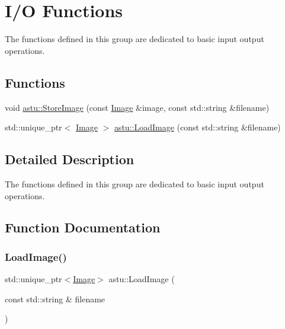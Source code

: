 \hypertarget{group__io__group}{}\section{I/O Functions}
\label{group__io__group}


The functions defined in this group are dedicated to basic input output operations.  


\subsection*{Functions}
\begin{DoxyCompactItemize}
\item 
void \hyperlink{group__io__group_gaca5f9cb8047c60049300242c20d30cd6}{astu\+::\+Store\+Image} (const \hyperlink{classastu_1_1Image}{Image} \&image, const std\+::string \&filename)
\item 
std\+::unique\+\_\+ptr$<$ \hyperlink{classastu_1_1Image}{Image} $>$ \hyperlink{group__io__group_ga46ac561eac42d4ace785797db8bc89a0}{astu\+::\+Load\+Image} (const std\+::string \&filename)
\end{DoxyCompactItemize}


\subsection{Detailed Description}
The functions defined in this group are dedicated to basic input output operations. 



\subsection{Function Documentation}
\mbox{\label{group__io__group_ga46ac561eac42d4ace785797db8bc89a0}} 
\subsubsection{\texorpdfstring{Load\+Image()}{LoadImage()}}
{\footnotesize\ttfamily std\+::unique\+\_\+ptr$<$\hyperlink{classastu_1_1Image}{Image}$>$ astu\+::\+Load\+Image (\begin{DoxyParamCaption}\item[{const std\+::string \&}]{filename }\end{DoxyParamCaption})}

